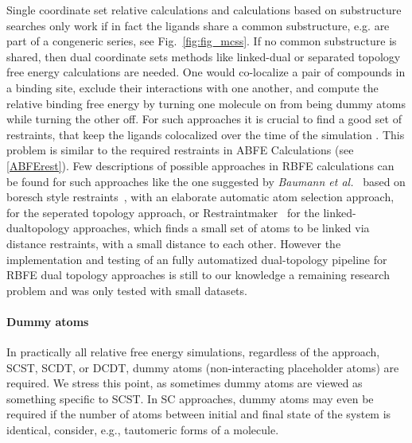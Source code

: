 \documentclass[9pt,bestpractices,pubversion]{livecoms}
\begin{document}
Single coordinate set relative calculations and calculations based on substructure searches only work if in fact the ligands share a common substructure, e.g. are part of a congeneric series, see Fig.~\ref{fig:fig_mcss}.
If no common substructure is shared, then dual coordinate sets methods like linked-dual or separated topology free energy calculations are needed. One would co-localize a pair of compounds in a binding site, exclude their interactions with one another, and compute the relative binding free energy by turning one molecule on from being dummy atoms while turning the other off.
For such approaches it is crucial to find a good set of restraints, that keep the ligands colocalized over the time of the simulation . This problem is similar to the required restraints in ABFE Calculations (see \ref{ABFErest}). Few descriptions of possible approaches in RBFE calculations can be found for such approaches like the one suggested by \textit{Baumann et al.}~\cite{baumann2023broadening} based on boresch style restraints~\cite{boresch2003absolute}, with an elaborate automatic atom selection approach, for the seperated topology approach, or Restraintmaker~\cite{ries2022restraintmaker} for the linked-dualtopology approaches, which finds a small set of atoms to be linked via distance restraints, with a small distance to each other. 
However the implementation and testing of an fully automatized dual-topology pipeline for RBFE dual topology approaches is still to our knowledge a remaining research problem and was only tested with small datasets. \cite{jespers2019qligfep, Rieder2022Lev}

\paragraph{Dummy atoms}

In practically all relative free energy simulations, regardless of the approach, SCST, SCDT, or DCDT, dummy atoms (non-interacting placeholder atoms) are required. We stress this point, as sometimes dummy atoms are viewed as something specific to SCST. In SC approaches, dummy atoms may even be required if the number of atoms between initial and final state of the system is identical, consider, e.g., tautomeric forms of a molecule.
\end{document}
